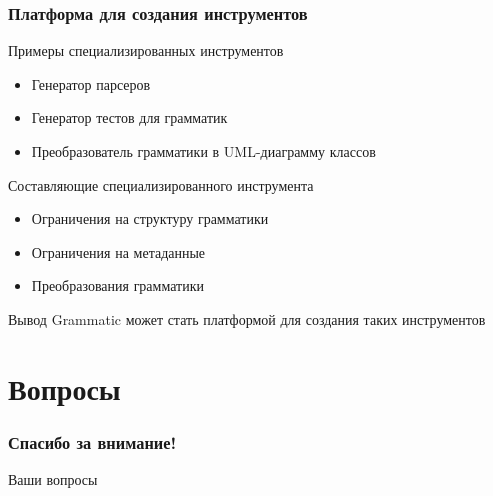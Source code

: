 \documentclass[paper=screen,10pt,unicode]{beamer}
\begin{document}
\begin{frame}
	\frametitle{Платформа для создания инструментов}

	\begin{block}{Примеры специализированных инструментов}
		\begin{itemize}
			\item Генератор парсеров
			\item Генератор тестов для грамматик
			\item Преобразователь грамматики в UML-диаграмму классов
		\end{itemize}
	\end{block}
	\begin{block}{Составляющие специализированного инструмента}
		\begin{itemize}
			\item Ограничения на структуру грамматики
			\item Ограничения на метаданные
			\item Преобразования грамматики
		\end{itemize}
	\end{block}
	\begin{block}{Вывод}
		Grammatic может стать платформой для создания таких инструментов
	\end{block}
\end{frame}

\section{Вопросы}

\begin{frame}
	\frametitle{Спасибо за внимание!}
	
	Ваши вопросы
\end{frame}
\end{document}
